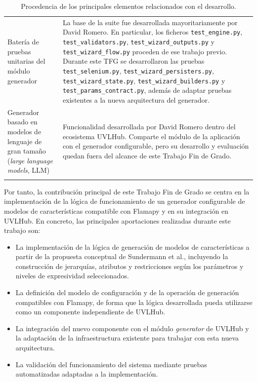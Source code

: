 \begin{longtable}{@{}>{\raggedright\arraybackslash}p{5cm}
>{\raggedright\arraybackslash}p{\dimexpr\textwidth-5cm-2\tabcolsep\relax}@{}}
Batería de pruebas unitarias del módulo generador &
La base de la suite fue desarrollada mayoritariamente por David Romero. En
particular, los ficheros \texttt{test\_engine.py}, \texttt{test\_validators.py},
\texttt{test\_wizard\_outputs.py} y \texttt{test\_wizard\_flow.py} proceden de
ese trabajo previo. Durante este TFG se desarrollaron las pruebas
\texttt{test\_selenium.py}, \texttt{test\_wizard\_persisters.py},
\texttt{test\_wizard\_state.py}, \texttt{test\_wizard\_builders.py} y
\texttt{test\_params\_contract.py}, además de adaptar pruebas existentes a la
nueva arquitectura del generador. \\

Generador basado en modelos de lenguaje de gran tamaño
(\textit{large language models}, LLM) &
Funcionalidad desarrollada por David Romero dentro del ecosistema UVLHub.
Comparte el módulo de la aplicación con el generador configurable, pero su
desarrollo y evaluación quedan fuera del alcance de este Trabajo Fin de
Grado. \\

\bottomrule
\caption{Procedencia de los principales elementos relacionados con el desarrollo.}
\label{tab:procedencia-elementos}\\
\end{longtable}


Por tanto, la contribución principal de este Trabajo Fin de Grado se centra
en la implementación de la lógica de funcionamiento de un generador
configurable de modelos de características compatible con Flamapy y en su
integración en UVLHub. En concreto,
las principales aportaciones realizadas durante este trabajo son:

\begin{itemize}
      \item La implementación de la lógica de generación de modelos de
      características a partir de la propuesta conceptual de Sundermann et al.,
      incluyendo la construcción de jerarquías, atributos y restricciones según
      los parámetros y niveles de expresividad seleccionados.

      \item La definición del modelo de configuración y de la operación de
      generación compatibles con Flamapy, de forma que la lógica desarrollada
      pueda utilizarse como un componente independiente de UVLHub.

      \item La integración del nuevo componente con el módulo \textit{generator} de UVLHub
      y la adaptación de la infraestructura existente para trabajar con esta nueva
      arquitectura.

      \item La validación del funcionamiento del sistema mediante pruebas
      automatizadas adaptadas a la implementación.
\end{itemize}

